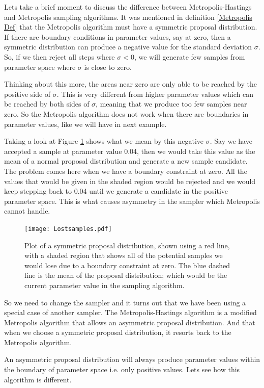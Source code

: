 \documentclass[12pt,twoside]{report}   %
\begin{document}
Lets take a brief moment to discuss the difference between Metropolis-Hastings and Metropolis sampling algorithms. It was mentioned in definition \ref{Metropolis Def} that the Metropolis algorithm must have a symmetric proposal distribution. If there are boundary conditions in parameter values, say at zero, then a symmetric distribution can produce a negative value for the standard deviation $\sigma$. So, if we then reject all steps where $\sigma < 0$, we will generate few samples from parameter space where $\sigma$ is close to zero.

Thinking about this more, the areas near zero are only able to be reached by the positive side of $\sigma$. This is very different from higher parameter values which can be reached by both sides of $\sigma$, meaning that we produce too few samples near zero. So the Metropolis algorithm does not work when there are boundaries in parameter values, like we will have in next example.

Taking a look at Figure \ref{fig1.7} shows what we mean by this negative $\sigma$. Say we have accepted a sample at parameter value 0.04, then we would take this value as the mean of a normal proposal distribution and generate a new sample candidate. The problem comes here when we have a boundary constraint at zero. All the values that would be given in the shaded region would be rejected and we would keep stepping back to 0.04 until we generate a candidate in the positive parameter space. This is what causes asymmetry in the sampler which Metropolis cannot handle.
\begin{figure}[H]
\centering
\texttt{[image: Lostsamples.pdf]}
\caption{Plot of a symmetric proposal distribution, shown using a red line, with a shaded region that shows all of the potential samples we would lose due to a boundary constraint at zero. The blue dashed line is the mean of the proposal distribution; which would be the current parameter value in the sampling algorithm.}
\label{fig1.7}
\end{figure}

So we need to change the sampler and it turns out that we have been using a special case of another sampler. The Metropolis-Hastings algorithm is a modified Metropolis algorithm that allows an asymmetric proposal distribution. And that when we choose a symmetric proposal distribution, it resorts back to the Metropolis algorithm.

An asymmetric proposal distribution will always produce parameter values within the boundary of parameter space i.e. only positive values. Lets see how this algorithm is different.
\end{document}
